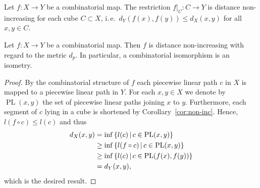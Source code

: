 \begin{cor}
  \label{cor:non-inc}
  Let \(f\colon X \to Y\) be a combinatorial map. The restriction \(f|_C\colon C \to Y\) is distance non-increasing for each cube \(C \subset X\), i.\,e.\ \(d_Y(f(x), f(y)) \leq d_X(x,y)\) for all \(x,y \in C\).
\end{cor}

\begin{prop}
  \label{prop:non-inc}
  Let \(f\colon X \to Y\) be a combinatorial map. Then \(f\) is distance non-increasing with regard to the metric \(d_p\). In particular, a combinatorial isomorphism is an isometry.
\end{prop}

\begin{proof}
  By the combinatorial structure of \(f\) each piecewise linear path \(c\) in \(X\) is mapped to a piecewise linear path in \(Y\). For each \(x,y \in X\) we denote by \(\operatorname{PL}(x,y)\) the set of piecewise linear paths joining \(x\) to \(y\). Furthermore, each segment of \(c\) lying in a cube is shortened by Corollary~\ref{cor:non-inc}. Hence, \(l(f \circ c) \leq l(c)\) and thus
  \begin{align*}
    d_X(x,y)
    & = \inf\left\{l(c) \,\middle|\, c \in \operatorname{PL}(x,y)\right\}\\
    & \geq \inf\left\{l(f \circ c) \,\middle|\, c \in \operatorname{PL}(x,y)\right\}\\
    & \geq \inf\left\{l(c) \,\middle|\, c \in \operatorname{PL}(f(x), f(y))\right\}\\
    & = d_Y(x,y),
  \end{align*}
  which is the desired result.
\end{proof}


